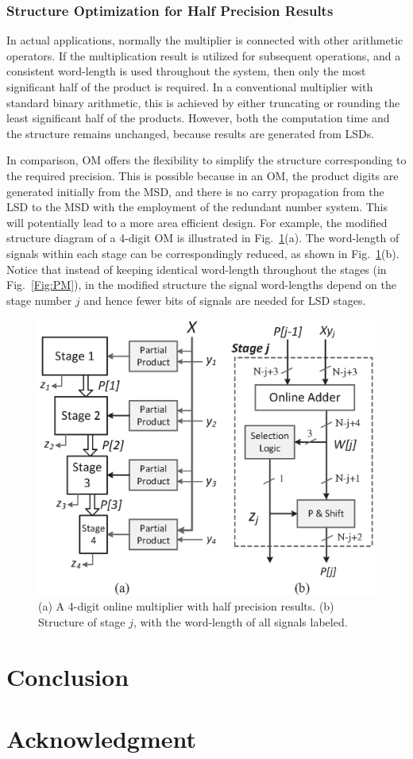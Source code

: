 \documentclass[10pt, conference, compsocconf]{IEEEtran}
\begin{document}
\subsubsection{Structure Optimization for Half Precision Results}
In actual applications, normally the multiplier is connected with other arithmetic operators. If the multiplication result is utilized for subsequent operations, and a consistent word-length is used throughout the system, then only the most significant half of the product is required. In a conventional multiplier with standard binary arithmetic, this is achieved by either truncating or rounding the least significant half of the products. However, both the computation time and the structure remains unchanged, because results are generated from LSDs.

In comparison, OM offers the flexibility to simplify the structure corresponding to the required precision. This is possible because in an OM, the product digits are generated initially from the MSD, and there is no carry propagation from the LSD to the MSD with the employment of the redundant number system. This will potentially lead to a more area efficient design. For example, the modified structure diagram of a 4-digit OM is illustrated in Fig.~\ref{Fig:PM_half}(a). The word-length of signals within each stage can be correspondingly reduced, as shown in Fig.~\ref{Fig:PM_half}(b). Notice that instead of keeping identical word-length throughout the stages (in Fig.~\ref{Fig:PM}), in the modified structure the signal word-lengths depend on the stage number $j$ and hence fewer bits of signals are needed for LSD stages.

\begin{figure}[tbp]
  \centering
  \includegraphics[width=.42\textwidth]{./figures/ParallelMult_MSDhalf.eps}
  \caption{(a) A 4-digit online multiplier with half precision results. (b) Structure of stage $j$, with the word-length of all signals labeled.}
    \vspace{-2ex}
  \label{Fig:PM_half}
\end{figure}

\section{Conclusion}

\section*{Acknowledgment}





\end{document}
